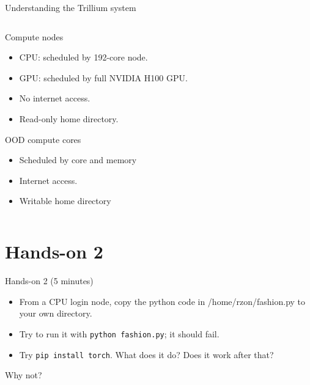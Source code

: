 \documentclass[
  10pt,
  ignorenonframetext,
  aspectratio=169]{beamer}
\providecommand{\tightlist}{%
  \setlength{\itemsep}{0pt}\setlength{\parskip}{0pt}}
\begin{document}
\begin{frame}{Understanding the Trillium system}
\begin{columns}[T]
\begin{column}{0.47\linewidth}
\begin{block}{Compute nodes}\setlength{\parskip}{0.5\baselineskip}
\label{compute-nodes-1}
\vspace{-1mm}

\begin{itemize}
\tightlist
\item
  CPU: scheduled by 192-core node.
\item
  GPU: scheduled by full NVIDIA H100 GPU.
\item
  No internet access.
\item
  Read-only home directory.
\end{itemize}
\end{block}

\begin{block}{OOD compute cores}\setlength{\parskip}{0.5\baselineskip}
\label{ood-compute-cores-1}
\vspace{-1mm}

\begin{itemize}
\tightlist
\item
  Scheduled by core and memory
\item
  Internet access.
\item
  Writable home directory
\end{itemize}
\end{block}
\end{column}
\end{columns}
\end{frame}

\section{Hands-on 2}\label{hands-on-2}

\begin{frame}[fragile]{Hands-on 2 (5 minutes)}
\label{hands-on-2-5-minutes}
\begin{itemize}
\item
  From a CPU login node, copy the python code in /home/rzon/fashion.py to your own directory.
\item
  Try to run it with \texttt{python\ fashion.py}; it should fail.
\item
  Try \texttt{pip\ install\ torch}. What does it do? Does it work after that?
\end{itemize}

Why not?
\end{frame}
\end{document}
